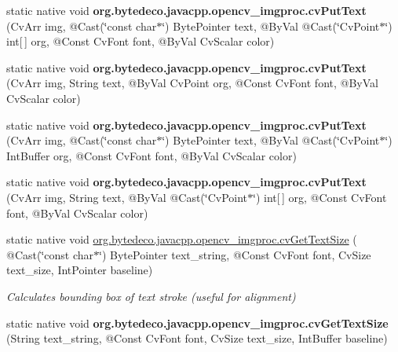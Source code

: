 \begin{DoxyCompactItemize}
static native void {\bfseries org.\+bytedeco.\+javacpp.\+opencv\+\_\+imgproc.\+cv\+Put\+Text} (Cv\+Arr img, @Cast(\char`\"{}const char$\ast$\char`\"{}) Byte\+Pointer text, @By\+Val @Cast(\char`\"{}Cv\+Point$\ast$\char`\"{}) int\mbox{[}$\,$\mbox{]} org, @Const Cv\+Font font, @By\+Val Cv\+Scalar color)
\item 
\mbox{\label{group__imgproc__c_gaf21746d9b276c4e4d3106cb3fbeeae73}} 
static native void {\bfseries org.\+bytedeco.\+javacpp.\+opencv\+\_\+imgproc.\+cv\+Put\+Text} (Cv\+Arr img, String text, @By\+Val Cv\+Point org, @Const Cv\+Font font, @By\+Val Cv\+Scalar color)
\item 
\mbox{\label{group__imgproc__c_ga97181bc021938d68aa28974ced75746f}} 
static native void {\bfseries org.\+bytedeco.\+javacpp.\+opencv\+\_\+imgproc.\+cv\+Put\+Text} (Cv\+Arr img, @Cast(\char`\"{}const char$\ast$\char`\"{}) Byte\+Pointer text, @By\+Val @Cast(\char`\"{}Cv\+Point$\ast$\char`\"{}) Int\+Buffer org, @Const Cv\+Font font, @By\+Val Cv\+Scalar color)
\item 
\mbox{\label{group__imgproc__c_ga3461298f05ca3166f817aaf0d7d617e6}} 
static native void {\bfseries org.\+bytedeco.\+javacpp.\+opencv\+\_\+imgproc.\+cv\+Put\+Text} (Cv\+Arr img, String text, @By\+Val @Cast(\char`\"{}Cv\+Point$\ast$\char`\"{}) int\mbox{[}$\,$\mbox{]} org, @Const Cv\+Font font, @By\+Val Cv\+Scalar color)
\item 
static native void \hyperlink{group__imgproc__c_gaadcbbe95eaad71798726cedfd442c08f}{org.\+bytedeco.\+javacpp.\+opencv\+\_\+imgproc.\+cv\+Get\+Text\+Size} ( @Cast(\char`\"{}const char$\ast$\char`\"{}) Byte\+Pointer text\+\_\+string, @Const Cv\+Font font, Cv\+Size text\+\_\+size, Int\+Pointer baseline)
\begin{DoxyCompactList}\small\item\em Calculates bounding box of text stroke (useful for alignment) \end{DoxyCompactList}\item 
\mbox{\label{group__imgproc__c_ga7aae4f6758c2093c79ef9e243ce4cc0d}} 
static native void {\bfseries org.\+bytedeco.\+javacpp.\+opencv\+\_\+imgproc.\+cv\+Get\+Text\+Size} (String text\+\_\+string, @Const Cv\+Font font, Cv\+Size text\+\_\+size, Int\+Buffer baseline)
\item 
\mbox{\label{group__imgproc__c_gaf42c240c3f57547d032750560abd1626}} 

\end{DoxyCompactItemize}
